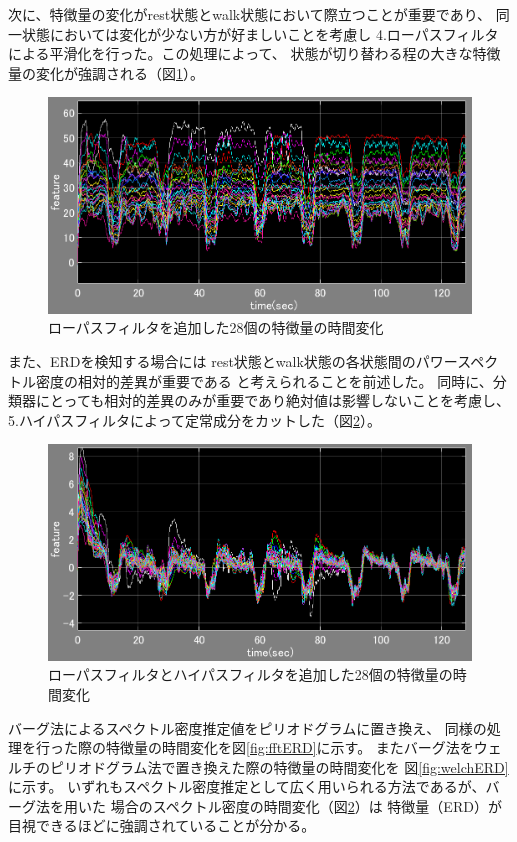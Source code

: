 次に、特徴量の変化がrest状態とwalk状態において際立つことが重要であり、
同一状態においては変化が少ない方が好ましいことを考慮し
4.ローパスフィルタによる平滑化を行った。この処理によって、
状態が切り替わる程の大きな特徴量の変化が強調される（図\ref{fig:lfilterERD}）。
\begin{figure}[p]
    \centering
    \includegraphics[width=13cm]{images/feature_sub1_l.png}
    \caption{ローパスフィルタを追加した28個の特徴量の時間変化}
    \label{fig:lfilterERD}
\end{figure}

また、ERDを検知する場合には
rest状態とwalk状態の各状態間のパワースペクトル密度の相対的差異が重要である
と考えられることを前述した。
同時に、分類器にとっても相対的差異のみが重要であり絶対値は影響しないことを考慮し、
5.ハイパスフィルタによって定常成分をカットした（図\ref{fig:filterERD}）。
\begin{figure}[p]
    \centering
    \includegraphics[width=13cm]{images/feature_sub1.png}
    \caption{ローパスフィルタとハイパスフィルタを追加した28個の特徴量の時間変化}
    \label{fig:filterERD}
\end{figure}

バーグ法によるスペクトル密度推定値をピリオドグラムに置き換え、
同様の処理を行った際の特徴量の時間変化を図\ref{fig:fftERD}に示す。
またバーグ法をウェルチのピリオドグラム法で置き換えた際の特徴量の時間変化を
図\ref{fig:welchERD}に示す。
いずれもスペクトル密度推定として広く用いられる方法であるが、バーグ法を用いた
場合のスペクトル密度の時間変化（図\ref{fig:filterERD}）は
特徴量（ERD）が目視できるほどに強調されていることが分かる。

